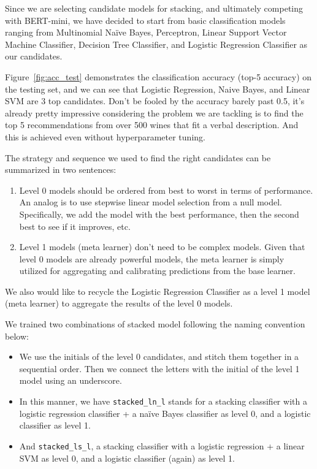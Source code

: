 \documentclass[
	a4paper,
	fontsize=10pt, %
	twoside=false, %
	secnumdepth=2, %
]{kaohandt}
\begin{document}
Since we are selecting candidate models for stacking, and ultimately competing with BERT-mini, we have decided to start from basic classification models ranging from Multinomial Naïve Bayes, Perceptron, Linear Support Vector Machine Classifier, Decision Tree Classifier, and Logistic Regression Classifier as our candidates.

Figure~\ref{fig:acc_test} demonstrates the classification accuracy (top-5 accuracy) on the testing set, and we can see that Logistic Regression, Naive Bayes, and Linear SVM are 3 top candidates. Don’t be fooled by the accuracy barely past 0.5, it’s already pretty impressive considering the problem we are tackling is to find the top 5 recommendations from over 500 wines that fit a verbal description. And this is achieved even without hyperparameter tuning.

The strategy and sequence we used to find the right candidates can be summarized in two sentences:

\begin{enumerate}
	\item Level 0 models should be ordered from best to worst in terms of performance. An analog is to use stepwise linear model selection from a null model. Specifically, we add the model with the best performance, then the second best to see if it improves, etc.
	\item Level 1 models (meta learner) don’t need to be complex models. Given that level 0 models are already powerful models, the meta learner is simply utilized for aggregating and calibrating predictions from the base learner.
\end{enumerate}

We also would like to recycle the Logistic Regression Classifier as a level 1 model (meta learner) to aggregate the results of the level 0 models.

We trained two combinations of stacked model following the naming convention below:

\begin{itemize}
	\item We use the initials of the level 0 candidates, and stitch them together in a sequential order. Then we connect the letters with the initial of the level 1 model using an underscore.
	\item In this manner, we have \texttt{stacked\_ln\_l} stands for a stacking classifier with a logistic regression classifier + a naïve Bayes classifier as level 0, and a logistic classifier as level 1.
	\item And \texttt{stacked\_ls\_l}, a stacking classifier with a logistic regression + a linear SVM as level 0, and a logistic classifier (again) as level 1.
\end{itemize}
\end{document}
